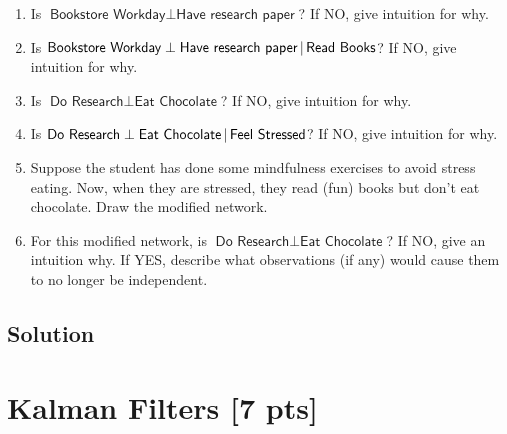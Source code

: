\documentclass[submit]{harvardml}
\newcommand{\attr}[1]{\textsf{#1}}
\begin{document}
\begin{problem}
%
\begin{enumerate}
\item Is $\attr{Bookstore Workday} \perp \attr{Have research paper}$?
  If NO, give intuition for why.
%
%
\item Is $\attr{Bookstore Workday} \perp \attr{Have research
  paper}\given \attr{Read Books}$? If NO, give intuition for why.
%
%
\item Is $\attr{Do Research} \perp \attr{Eat Chocolate}$? If NO, give
  intuition for why.
%
\item Is $\attr{Do Research} \perp \attr{Eat Chocolate} \given
  \attr{Feel Stressed}$? If NO, give intuition for why.
%
\item Suppose the student has done some mindfulness exercises to avoid
  stress eating.  Now, when they are stressed, they read (fun) books
  but don't eat chocolate.  Draw the modified network.
%
%
\item For this modified network, is $\attr{Do Research} \perp
  \attr{Eat Chocolate}$? If NO, give an intuition why.  If YES,
  describe what observations (if any) would cause them to no longer be
  independent.
%
\end{enumerate}
\end{problem}
\subsection*{Solution}

\newpage

\section*{Kalman Filters [7 pts]}

\end{document}
